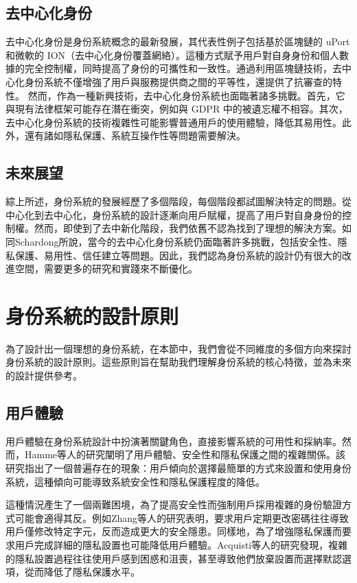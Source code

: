 \subsection{去中心化身份}
去中心化身份是身份系統概念的最新發展\cite{preukschat2021self}，其代表性例子包括基於區塊鏈的 uPort 和微軟的 ION（去中心化身份覆蓋網絡）\cite{lundkvist2017uport, microsoft2020ion}。這種方式賦予用戶對自身身份和個人數據的完全控制權，同時提高了身份的可攜性和一致性。通過利用區塊鏈技術，去中心化身份系統不僅增強了用戶與服務提供商之間的平等性，還提供了抗審查的特性。
然而，作為一種新興技術，去中心化身份系統也面臨著諸多挑戰\cite{s22155641}。首先，它與現有法律框架可能存在潛在衝突，例如與 GDPR 中的被遺忘權不相容\cite{finck2018blockchains}。其次，去中心化身份系統的技術複雜性可能影響普通用戶的使用體驗，降低其易用性\cite{kubach2020self}。此外，還有諸如隱私保護、系統互操作性等問題需要解決。
\subsection{未來展望}
綜上所述，身份系統的發展經歷了多個階段，每個階段都試圖解決特定的問題。從中心化到去中心化，身份系統的設計逐漸向用戶賦權，提高了用戶對自身身份的控制權。然而，即使到了去中新化階段，我們依舊不認為找到了理想的解決方案。如同Schardong\cite{s22155641}所說，當今的去中心化身份系統仍面臨著許多挑戰，包括安全性、隱私保護、易用性、信任建立等問題。因此，我們認為身份系統的設計仍有很大的改進空間，需要更多的研究和實踐來不斷優化。
\section{身份系統的設計原則}
為了設計出一個理想的身份系統，在本節中，我們會從不同維度的多個方向來探討身份系統的設計原則。這些原則旨在幫助我們理解身份系統的核心特徵，並為未來的設計提供參考。
\subsection{用戶體驗}
用戶體驗在身份系統設計中扮演著關鍵角色，直接影響系統的可用性和採納率。然而，Hamme等人\cite{inproceedings}的研究闡明了用戶體驗、安全性和隱私保護之間的複雜關係。該研究指出了一個普遍存在的現象：用戶傾向於選擇最簡單的方式來設置和使用身份系統，這種傾向可能導致系統安全性和隱私保護程度的降低。

這種情況產生了一個兩難困境，為了提高安全性而強制用戶採用複雜的身份驗證方式可能會適得其反。例如Zhang等人\cite{zhang2010security}的研究表明，要求用戶定期更改密碼往往導致用戶僅修改特定字元，反而造成更大的安全隱患。同樣地，為了增強隱私保護而要求用戶完成詳細的隱私設置也可能降低用戶體驗。Acquisti等人\cite{acquisti2017nudges}的研究發現，複雜的隱私設置過程往往使用戶感到困惑和沮喪，甚至導致他們放棄設置而選擇默認選項，從而降低了隱私保護水平。


